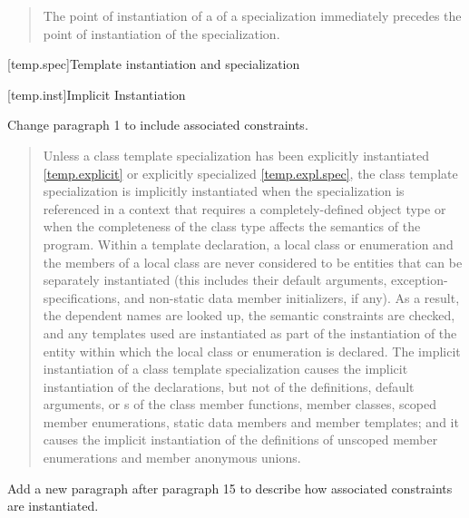 \begin{quote}
\setcounter{Paras}{4}
\pnum
The point of instantiation of a  of a
specialization immediately precedes the point of instantiation of
the specialization.
\end{quote}


[temp.spec]{Template instantiation and specialization}

[temp.inst]{Implicit Instantiation}
    
Change paragraph 1 to include associated constraints.

\begin{quote}
Unless a class template specialization has been explicitly
instantiated \ref{temp.explicit} or explicitly specialized \ref{temp.expl.spec}, 
the class template specialization is implicitly instantiated when the
specialization is referenced in a context that requires a
completely-defined object type or when the completeness of the
class type affects the semantics of the program. 
% 
\enternote
Within a template declaration, a local class or enumeration and the members
of a local class are never considered to be entities that can be
separately instantiated (this includes their default arguments,
exception-specifications, and non-static data member initializers, if any). 
% 
As a result, the dependent names are looked up, the semantic constraints 
are checked, and any templates used are instantiated as part of the
instantiation of the entity within which the local class or enumeration is 
declared.
\exitnote
% 
The implicit instantiation of a class template specialization causes the 
implicit instantiation of the declarations, but not of the definitions, default
arguments,  or
s of the class member functions,
member classes, scoped member enumerations, static data members and
member templates; and it causes the implicit instantiation of the
definitions of unscoped member enumerations and member anonymous
unions.
\end{quote}


Add a new paragraph after paragraph 15 to describe how associated
constraints are instantiated.

